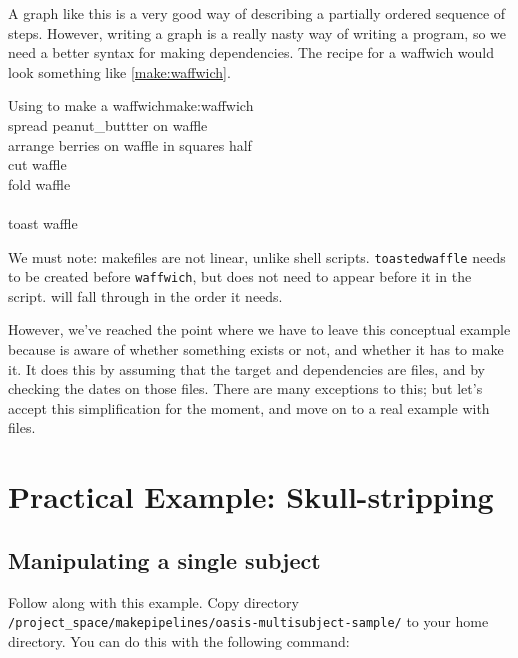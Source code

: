 A graph like this is a very good way of describing a partially ordered sequence of steps.  However, writing a graph is a really nasty way of writing a program, so we need a better syntax for making dependencies. The \maken{} recipe for a waffwich would look something like \autoref{make:waffwich}.

\begin{make}{Using \maken{} to make a waffwich}{make:waffwich}
	 \\
	\tab	spread peanut_buttter \dd on waffle \\
	\tab arrange berries \dd on waffle \dd in squares \dd half \\
	\tab cut waffle \\ 
	\tab fold waffle \\
	
	 \\
	\tab toast waffle
\end{make}

We must note: makefiles are not linear, unlike shell scripts. \texttt{toastedwaffle} needs to be created before \texttt{waffwich}, but does not need to appear before it in the script. \maken{} will fall through in the order it needs.

However, we've reached the point where we have to leave this conceptual example because \maken{} is aware of whether something exists or not, and whether it has to make it. It does this by assuming that the target and dependencies are files, and by checking the dates on those files. There are many exceptions to this; but let's accept this simplification for the moment, and move on to a real example with files.

\section{Practical Example: Skull-stripping}

\subsection{Manipulating a single subject}

Follow along with this example. Copy directory 
\newline\texttt{/project_space/makepipelines/oasis-multisubject-sample/} \newline
to your home directory. You can do this with the following command:

